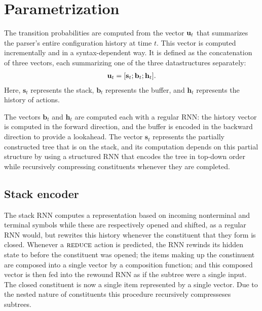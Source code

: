 \section{Parametrization}
The transition probabilities are computed from the vector $\mathbf{u}_t$ that summarizes the parser's entire configuration history at time $t$. This vector is computed incrementally and in a syntax-dependent way. It is defined as the concatenation of three vectors, each summarizing one of the three datastructures separately:
\begin{align*}
  \mathbf{u}_t = [\mathbf{s}_t; \mathbf{b}_t; \mathbf{h}_t].
\end{align*}
Here, $\mathbf{s}_t$ represents the stack, $\mathbf{b}_t$ represents the buffer, and $\mathbf{h}_t$ represents the history of actions.

The vectors $\mathbf{b}_t$ and $\mathbf{h}_t$ are computed each with a regular RNN: the history vector is computed in the forward direction, and the buffer is encoded in the backward direction to provide a lookahead. The vector $\mathbf{s}_t$ represents the partially constructed tree that is on the stack, and its computation depends on this partial structure by using a structured RNN that encodes the tree in top-down order while recursively compressing constituents whenever they are completed.

\subsection{Stack encoder}
The stack RNN computes a representation based on incoming nonterminal and terminal symbols while these are respectively opened and shifted, as a regular RNN would, but rewrites this history whenever the constituent that they form is closed. Whenever a $\textsc{reduce}$ action is predicted, the RNN rewinds its hidden state to before the constituent was opened; the items making up the constinuent are composed into a single vector by a composition function; and this composed vector is then fed into the rewound RNN as if the subtree were a single input. The closed constituent is now a single item represented by a single vector. Due to the nested nature of constituents this procedure recursively compresseses subtrees.

